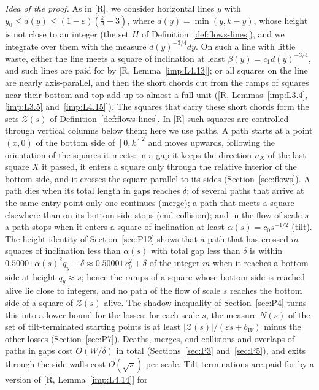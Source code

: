 \documentclass[11pt]{amsart}
\theoremstyle{definition}
\theoremstyle{remark}
\numberwithin{equation}{section}
\begin{document}
\emph{Idea of the proof.} As in [R], we consider horizontal lines $y$ with $y_0\le d(y)\le(1-\varepsilon)(\frac k2-3)$,
where $d(y)=\min(y,k-y)$, whose height is not close to an integer (the set $H$ of Definition~\ref{def:flows-lines}), and
we integrate over them with the measure $d(y)^{-3/4}dy$. On such a line with little waste, either the line meets a square
of inclination at least $\beta(y)=c_1d(y)^{-3/4}$, and such lines are paid for by [R, Lemma~\ref{imp:L4.13}]; or all
squares on the line are nearly axis-parallel, and then the short chords cut from the ramps of squares near their bottom
and top add up to almost a full unit ([R, Lemmas~\ref{imp:L3.4}, \ref{imp:L3.5} and~\ref{imp:L4.15}]). The squares that
carry these short chords form the sets $\mathcal Z(s)$ of Definition~\ref{def:flows-lines}. In [R] such squares are
controlled through vertical columns below them; here we use paths. A path starts at a point $(x,0)$ of the bottom side of
$[0,k]^2$ and moves upwards, following the orientation of the squares it meets: in a gap it keeps the direction $n_X$ of
the last square $X$ it passed, it enters a square only through the relative interior of the bottom side, and it crosses
the square parallel to its sides (Section~\ref{sec:flows}). A path dies when its total length in gaps reaches $\delta$;
of several paths that arrive at the same entry point only one continues (merge); a path that meets a square elsewhere
than on its bottom side stops (end collision); and in the flow of scale $s$ a path stops when it enters a square of
inclination at least $\alpha(s)=c_0s^{-1/2}$ (tilt). The height identity of Section~\ref{sec:P12} shows that a path that has
crossed $m$ squares of inclination less than $\alpha(s)$ with total gap less than $\delta$ is within
$0.50001\,\alpha(s)^2q_y+\delta\approx0.50001\,c_0^2+\delta$ of the integer $m$ when it reaches a bottom side at height
$q_y\approx s$; hence the ramps of a square whose bottom side is reached alive lie close to integers, and no path of
the flow of scale $s$ reaches the bottom side of a square of $\mathcal Z(s)$ alive. The shadow inequality of Section~\ref{sec:P4} turns this into a lower bound
for the losses: for each scale $s$, the measure $N(s)$ of the set of tilt-terminated starting points is at least
$|\mathcal Z(s)|/(\varepsilon s+b_W)$ minus the other losses (Section~\ref{sec:P7}). Deaths, merges, end collisions and
overlaps of paths in gaps cost $O(W/\delta)$ in total (Sections~\ref{sec:P3} and~\ref{sec:P5}), and exits through the
side walls cost $O(\sqrt s)$ per scale. Tilt terminations are paid for by a version of [R, Lemma~\ref{imp:L4.14}] for
\end{document}
